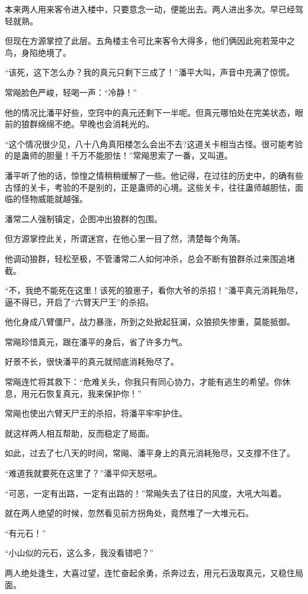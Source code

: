 \begin{this_body}
本来两人用来客令进入楼中，只要意念一动，便能出去。两人进出多次。早已经驾轻就熟。

但现在方源掌控了此层。五角楼主令可比来客令大得多，他们俩因此宛若笼中之鸟，身陷绝境了。

“该死，这下怎么办？我的真元只剩下三成了！”潘平大叫，声音中充满了惊慌。

常飚脸色严峻，轻喝一声：“冷静！”

他的情况比潘平好些，空窍中的真元还剩下一半呢。但真元哪怕处在完美状态，眼前的狼群绵绵不绝。早晚也会消耗光的。

“这个情况很少见，八十八角真阳楼怎么会出不去?这道关卡相当古怪。很可能考验的是蛊师的胆量！千万不能胆怯！”常飚思索了一番，又叫道。

潘平听了他的话，惊惶之情稍稍缓解了一些。他记得，在过往的历史中，的确有些古怪的关卡，考验的不是别的，正是蛊师的心境。这些关卡，往往蛊师越胆怯，面临的怪物威能就越强。

潘常二人强制镇定，企图冲出狼群的包围。

但方源掌控此关，所谓迷宫，在他心里一目了然，清楚每个角落。

他调动狼群，轻松至极，不管潘常二人如何冲杀，总会不断有狼群杀过来围追堵截。

“不，我绝不能死在这里！该死的狼崽子，看你大爷的杀招！”潘平真元消耗殆尽，逼不得已，开启了“六臂天尸王”的杀招。

他化身成八臂僵尸，战力暴涨，所到之处掀起狂澜，众狼损失惨重，莫能抵御。

常飚珍惜真元，跟在潘平的身后，省了许多力气。

好景不长，很快潘平的真元就彻底消耗殆尽了。

常飚连忙将其救下：“危难关头，你我只有同心协力，才能有逃生的希望。你休息，用元石恢复真元，我来保护你！”

常飚也使出六臂天尸王的杀招，将潘平牢牢护住。

就这样两人相互帮助，反而稳定了局面。

如此，过去了七八天的时间，常飚、潘平身上的真元消耗殆尽，又支撑不住了。

“难道我就要死在这里了？”潘平仰天怒吼。

“可恶，一定有出路，一定有出路的！”常飚失去了往日的风度，大吼大叫着。

就在两人绝望的时候，忽然看见前方拐角处，竟然堆了一大堆元石。

“有元石！”

“小山似的元石，这么多，我没看错吧？”

两人绝处逢生，大喜过望，连忙奋起余勇，杀奔过去，用元石汲取真元，又稳住局面。


\end{this_body}
